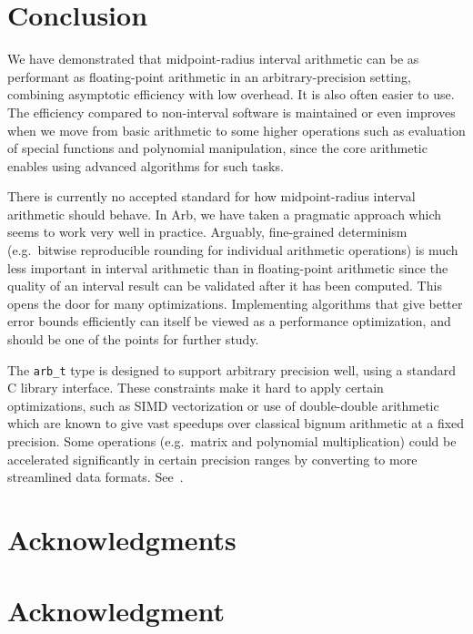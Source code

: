 \documentclass[10pt,journal,compsoc,cspaper]{IEEEtran}
\begin{document}
\section{Conclusion}

We have demonstrated that midpoint-radius interval arithmetic
can be as performant as floating-point arithmetic in an arbitrary-precision
setting, combining asymptotic efficiency with low overhead.
It is also often easier to use.
The efficiency compared to non-interval software
is maintained or even improves when we move
from basic arithmetic to some higher operations
such as evaluation of special functions and polynomial manipulation,
since the core arithmetic enables using advanced algorithms for such tasks.

There is currently no accepted standard for how midpoint-radius
interval arithmetic should behave.
In Arb, we have taken a pragmatic approach which seems
to work very well in practice.
Arguably, fine-grained determinism (e.g.\ bitwise reproducible
rounding for individual arithmetic operations)
is much less important in interval
arithmetic than in floating-point arithmetic
since the quality of an interval result can be validated after
it has been computed.
This opens the door for many optimizations.
Implementing algorithms that give better error bounds efficiently
can itself be viewed as a performance optimization,
and should be one of the points for further study.

The \texttt{arb\_t} type is designed to support
arbitrary precision well, using a standard C library interface.
These constraints make
it hard to apply certain optimizations, such as SIMD vectorization
or use of double-double arithmetic which are known to give vast speedups
over classical bignum arithmetic at a fixed precision.
Some operations (e.g.\ matrix and polynomial multiplication)
could be accelerated significantly in certain
precision ranges by converting to more streamlined data formats.
See~\cite{van2015faster,van2016evaluating,muller2016new}.

\ifCLASSOPTIONcompsoc
  \section*{Acknowledgments}
\else
  \section*{Acknowledgment}
\fi
\end{document}
